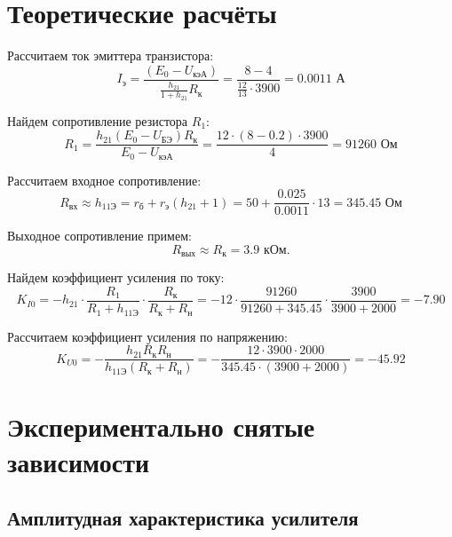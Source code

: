 \section{Теоретические расчёты}

Рассчитаем ток эмиттера транзистора: 
\begin{equation}
I_\text{э} = \frac{(E_0 - U_\text{кэА})}{\frac{h_{21}}{1+h_{21}}R_\text{к}} = \frac{8 - 4}{\frac{12}{13} \cdot 3900} = 0.0011 \text{ А}
\end{equation}

Найдем сопротивление резистора $R_1$:
\begin{equation}
R_1 = \frac{h_{21}(E_0-U_\text{БЭ})R_\text{к}}{E_0-U_\text{кэА}} = \frac{12 \cdot (8 - 0.2) \cdot 3900}{4} = 91260 \text{ Ом}
\end{equation}

Рассчитаем входное сопротивление:
\begin{equation}
R_\text{вх} \approx h_\text{11Э} = r_\text{б} + r_\text{э}(h_{21} + 1) = 50 + \frac{0.025}{0.0011} \cdot 13 = 345.45 \text{ Ом}
\end{equation}

Выходное сопротивление примем:
\begin{equation}
R_\text{вых} \approx R_\text{к} = 3.9 \text{ кОм}.
\end{equation}

Найдем коэффициент усиления по току:
\begin{equation}
K_{I0} %
= - h_{21} \cdot \frac{R_1}{R_1 + h_\text{11Э}} \cdot \frac{R_\text{к}}{R_\text{к}+R_\text{н}} %
= - 12 \cdot \frac{91260}{91260 + 345.45} \cdot \frac{3900}{3900+2000} %
= - 7.90
\end{equation}

Рассчитаем коэффициент усиления по напряжению:
\begin{equation}
K_{U0} %
= -\frac{h_{21} R_\text{к} R_\text{н}}{h_\text{11Э}(R_\text{к} + R_\text{н})} %
= -\frac{12 \cdot 3900 \cdot 2000}{345.45 \cdot (3900 + 2000)} %
= -45.92
\end{equation}

\newpage

\section{Экспериментально снятые зависимости}

\subsection{Амплитудная характеристика усилителя}


